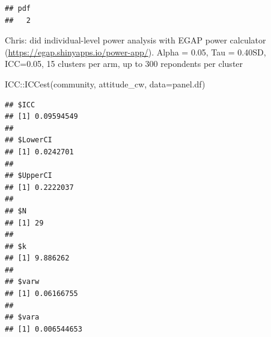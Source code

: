 \documentclass[
]{article}
\newenvironment{Shaded}{\begin{snugshade}}{\end{snugshade}}
\newcommand{\AttributeTok}[1]{\textcolor[rgb]{0.77,0.63,0.00}{#1}}
\newcommand{\DecValTok}[1]{\textcolor[rgb]{0.00,0.00,0.81}{#1}}
\newcommand{\FunctionTok}[1]{\textcolor[rgb]{0.00,0.00,0.00}{#1}}
\newcommand{\NormalTok}[1]{#1}
\newcommand{\SpecialCharTok}[1]{\textcolor[rgb]{0.00,0.00,0.00}{#1}}
\newcommand{\StringTok}[1]{\textcolor[rgb]{0.31,0.60,0.02}{#1}}
\begin{document}
\begin{Shaded}
\end{Shaded}

\begin{verbatim}
## pdf 
##   2
\end{verbatim}

Chris: did individual-level power analysis with EGAP power calculator
(\url{https://egap.shinyapps.io/power-app/}). Alpha = 0.05, Tau =
0.40SD, ICC=0.05, 15 clusters per arm, up to 300 repondents per cluster

\begin{Shaded}
\begin{Highlighting}[]
\NormalTok{ICC}\SpecialCharTok{::}\FunctionTok{ICCest}\NormalTok{(community, attitude\_cw, }\AttributeTok{data=}\NormalTok{panel.df)}
\end{Highlighting}
\end{Shaded}

\begin{verbatim}
## $ICC
## [1] 0.09594549
## 
## $LowerCI
## [1] 0.0242701
## 
## $UpperCI
## [1] 0.2222037
## 
## $N
## [1] 29
## 
## $k
## [1] 9.886262
## 
## $varw
## [1] 0.06166755
## 
## $vara
## [1] 0.006544653
\end{verbatim}
\end{document}
